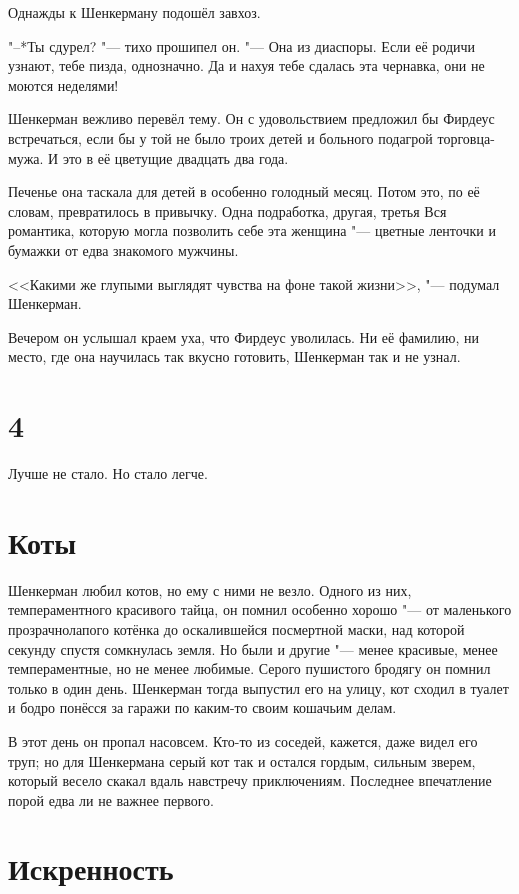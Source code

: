Однажды к Шенкерману подошёл завхоз.

"--*Ты сдурел? "--- тихо прошипел он.
"--- Она из диаспоры.
Если её родичи узнают, тебе пизда, однозначно.
Да и нахуя тебе сдалась эта чернавка, они не моются неделями!

Шенкерман вежливо перевёл тему.
Он с удовольствием предложил бы Фирдеус встречаться, если бы у той не было троих детей и больного подагрой торговца-мужа.
И это в её цветущие двадцать два года.

Печенье она таскала для детей в особенно голодный месяц.
Потом это, по её словам, превратилось в привычку.
Одна подработка, другая, третья\ldotst
Вся романтика, которую могла позволить себе эта женщина "--- цветные ленточки и бумажки от едва знакомого мужчины.

<<Какими же глупыми выглядят чувства на фоне такой жизни>>, "--- подумал Шенкерман.

Вечером он услышал краем уха, что Фирдеус уволилась.
Ни её фамилию, ни место, где она научилась так вкусно готовить, Шенкерман так и не узнал.

\section{4}

Лучше не стало.
Но стало легче.

\section{Коты}

Шенкерман любил котов, но ему с ними не везло.
Одного из них, темпераментного красивого тайца, он помнил особенно хорошо "--- от маленького прозрачнолапого котёнка до оскалившейся посмертной маски, над которой секунду спустя сомкнулась земля.
Но были и другие "--- менее красивые, менее темпераментные, но не менее любимые.
Серого пушистого бродягу он помнил только в один день.
Шенкерман тогда выпустил его на улицу, кот сходил в туалет и бодро понёсся за гаражи по каким-то своим кошачьим делам.

В этот день он пропал насовсем.
Кто-то из соседей, кажется, даже видел его труп;
но для Шенкермана серый кот так и остался гордым, сильным зверем, который весело скакал вдаль навстречу приключениям.
Последнее впечатление порой едва ли не важнее первого.

\section{Искренность}

